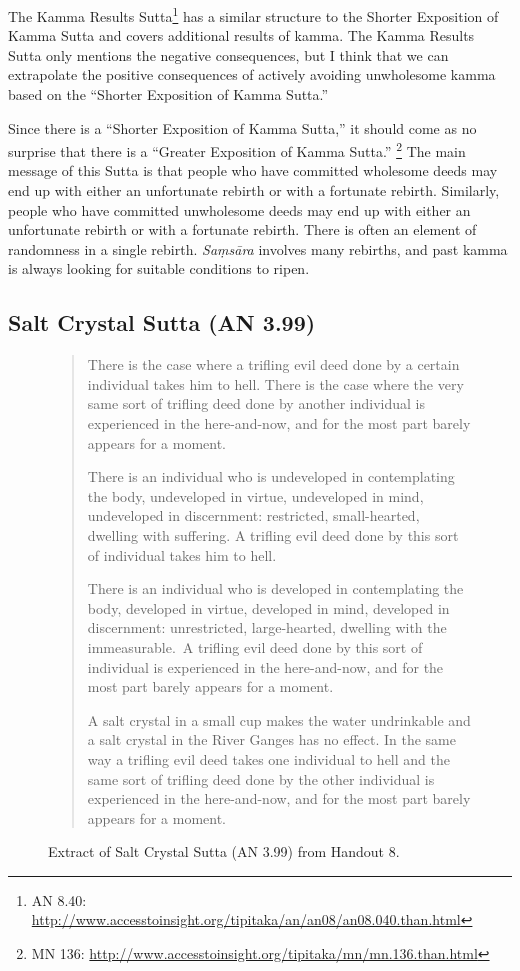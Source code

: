 The Kamma Results Sutta\footnote{AN 8.40: \url{http://www.accesstoinsight.org/tipitaka/an/an08/an08.040.than.html}} has a similar structure to the Shorter Exposition of Kamma Sutta and covers additional results of kamma. The Kamma Results Sutta only mentions the negative consequences, but I think that we can extrapolate the positive consequences of actively avoiding unwholesome kamma based on the “Shorter Exposition of Kamma Sutta.”

Since there is a “Shorter Exposition of Kamma Sutta,” it should come as no surprise that there is a “Greater Exposition of Kamma Sutta.” \footnote{MN 136: \url{http://www.accesstoinsight.org/tipitaka/mn/mn.136.than.html}} The main message of this Sutta is that people who have committed wholesome deeds may end up with either an unfortunate rebirth or with a fortunate rebirth. Similarly, people who have committed unwholesome deeds may end up with either an unfortunate rebirth or with a fortunate rebirth. There is often an element of randomness in a single rebirth. \textit{Saṃsāra} involves many rebirths, and past kamma is always looking for suitable conditions to ripen.

\subsection*{Salt Crystal Sutta (AN 3.99)}

\begin{figure}[H]
\begin{quotation}
There is the case where a trifling evil deed done by a certain individual takes him to hell. There is the case where the very same sort of trifling deed done by another individual is experienced in the here-and-now, and for the most part barely appears for a moment.

There is an individual who is undeveloped in contemplating the body, undeveloped in virtue, undeveloped in mind, undeveloped in discernment: restricted, small-hearted, dwelling with suffering. A trifling evil deed done by this sort of individual takes him to hell.

There is an individual who is developed in contemplating the body, developed in virtue, developed in mind, developed in discernment: unrestricted, large-hearted, dwelling with the immeasurable. A trifling evil deed done by this sort of individual is experienced in the here-and-now, and for the most part barely appears for a moment. 

A salt crystal in a small cup makes the water undrinkable and a salt crystal in the River Ganges has no effect. In the same way a trifling evil deed takes one individual to hell and the same sort of trifling deed done by the other individual is experienced in the here-and-now, and for the most part barely appears for a moment.
\end{quotation}
\caption{Extract of Salt Crystal Sutta (AN 3.99) from Handout 8.}
\label{fig:AN3}
\end{figure}

